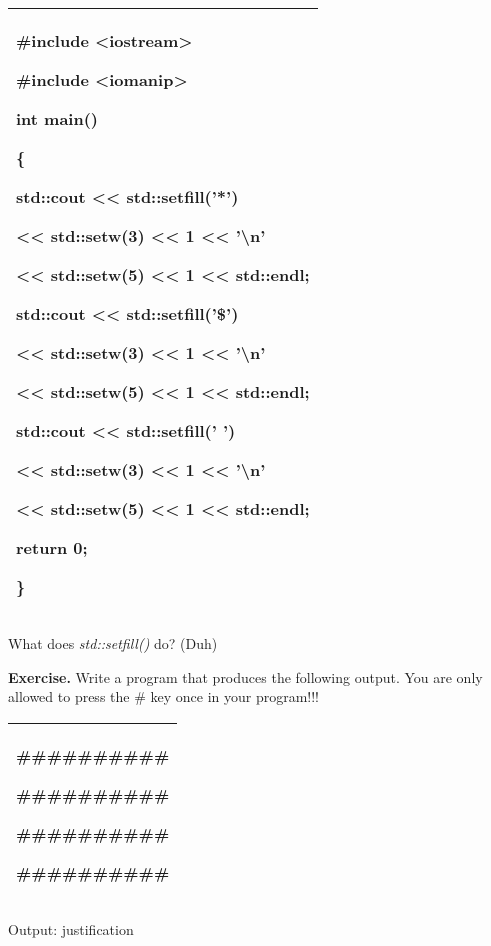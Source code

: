\documentclass[
]{article}
\begin{document}
\begin{longtable}[]{@{}l@{}}
\toprule
\endhead
\begin{minipage}[t]{0.97\columnwidth}\raggedright
\#include \textless iostream\textgreater{}

\#include \textless iomanip\textgreater{}

int main()

\{

std::cout \textless\textless{} std::setfill('*')

\textless\textless{} std::setw(3) \textless\textless{} 1
\textless\textless{} '\textbackslash n'

\textless\textless{} std::setw(5) \textless\textless{} 1
\textless\textless{} std::endl;

std::cout \textless\textless{} std::setfill('\$')

\textless\textless{} std::setw(3) \textless\textless{} 1
\textless\textless{} '\textbackslash n'

\textless\textless{} std::setw(5) \textless\textless{} 1
\textless\textless{} std::endl;

std::cout \textless\textless{} std::setfill(' ')

\textless\textless{} std::setw(3) \textless\textless{} 1
\textless\textless{} '\textbackslash n'

\textless\textless{} std::setw(5) \textless\textless{} 1
\textless\textless{} std::endl;

return 0;

\}\strut
\end{minipage}\tabularnewline
\bottomrule
\end{longtable}

What does \emph{std::setfill()} do? (Duh)

\textbf{Exercise.} Write a program that produces the following output.
You are only allowed to press the \# key once in your program!!!

\begin{longtable}[]{@{}l@{}}
\toprule
\endhead
\begin{minipage}[t]{0.97\columnwidth}\raggedright
\#\#\#\#\#\#\#\#\#\#

\#\#\#\#\#\#\#\#\#\#

\#\#\#\#\#\#\#\#\#\#

\#\#\#\#\#\#\#\#\#\#\strut
\end{minipage}\tabularnewline
\bottomrule
\end{longtable}

Output: justification
\end{document}
